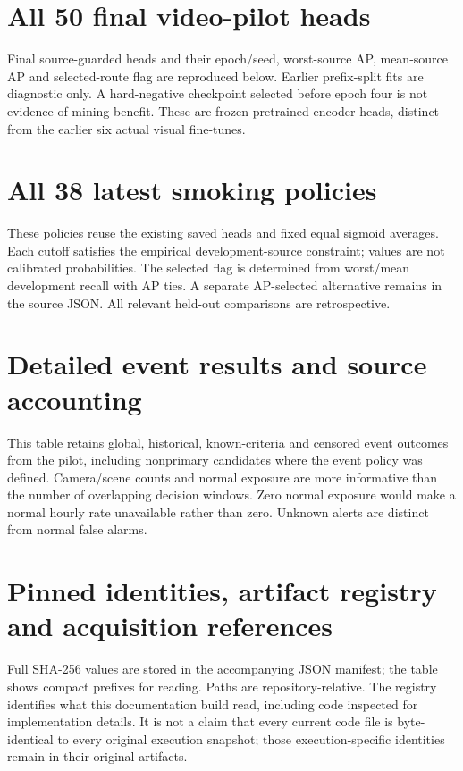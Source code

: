 \chapter{All 50 final video-pilot heads}
Final source-guarded heads and their epoch/seed, worst-source AP, mean-source AP and selected-route flag are reproduced below. Earlier prefix-split fits are diagnostic only. A hard-negative checkpoint selected before epoch four is not evidence of mining benefit. These are frozen-pretrained-encoder heads, distinct from the earlier six actual visual fine-tunes.


\chapter{All 38 latest smoking policies}
These policies reuse the existing saved heads and fixed equal sigmoid averages. Each cutoff satisfies the empirical development-source constraint; values are not calibrated probabilities. The selected flag is determined from worst/mean development recall with AP ties. A separate AP-selected alternative remains in the source JSON. All relevant held-out comparisons are retrospective.


\chapter{Detailed event results and source accounting}
This table retains global, historical, known-criteria and censored event outcomes from the pilot, including nonprimary candidates where the event policy was defined. Camera/scene counts and normal exposure are more informative than the number of overlapping decision windows. Zero normal exposure would make a normal hourly rate unavailable rather than zero. Unknown alerts are distinct from normal false alarms.



\chapter{Pinned identities, artifact registry and acquisition references}
Full SHA-256 values are stored in the accompanying JSON manifest; the table shows compact prefixes for reading. Paths are repository-relative. The registry identifies what this documentation build read, including code inspected for implementation details. It is not a claim that every current code file is byte-identical to every original execution snapshot; those execution-specific identities remain in their original artifacts.

